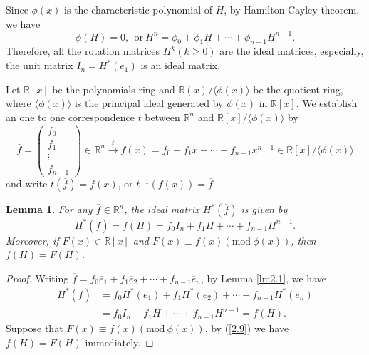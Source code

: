 \documentclass [11pt]{article}
\newtheorem{lem}[thm]{\bf Lemma}
\begin{document}
Since $\phi(x)$ is the characteristic polynomial of $H$, by Hamilton-Cayley theorem, we have
\begin{equation}\label{2.9}
\phi(H)=0, \ \ \text{or}\  H^{n}=\phi_{0}+\phi_{1} H+\cdots+\phi_{n-1} H^{n-1}.
\end{equation}
Therefore, all the rotation matrices $H^{k}(k \geq 0)$ are the ideal matrices, especially, the unit matrix $I_{n}=H^{*}\left(\overline{e}_{1}\right)$ is an ideal matrix.

Let $\mathbb{R}[x]$ be the polynomials ring and $\mathbb{R}(x) /\langle\phi(x)\rangle$ be the quotient ring, where $\langle\phi(x)\rangle$ is the principal ideal generated by $\phi(x)$ in $\mathbb{R}[x]$. We establish an one to one correspondence $t$ between $\mathbb{R}^{n}$ and $\mathbb{R}[x]/ \langle\phi(x)\rangle$ by
\begin{equation}\label{2.10}
\overline{f}=\left(\begin{array}{c}
f_{0} \\
f_{1} \\
\vdots \\
f_{n-1}
\end{array}\right)\in \mathbb{R}^{n} \stackrel{t}{\longrightarrow} f(x)=f_{0}+f_{1} x+\cdots+f_{n-1} x^{n-1} \in \mathbb{R}[x]/ \langle\phi(x)\rangle
\end{equation}
and write $t(\overline{f})=f(x)$, or $t^{-1}(f(x))=\overline{f}$.

\begin{lem} \label{lm2.2}
For any $\overline{f} \in \mathbb{R}^{n}$, the ideal matrix $H^{*}(\overline{f})$ is given by
 \begin{equation}\label{2.11}
 H^{*}( \overline{f})=f(H)=f_{0}I_{n}+f_{1}H+\cdots+f_{n-1}H^{n-1}.
 \end{equation}
 Moreover, if $F(x) \in \mathbb{R}[x]$ and $F(x)\equiv f(x)(\text{mod}\ \phi(x))$, then $f(H)=F(H)$.
 \end{lem}
 \begin{proof}
 Writing $\overline{f}=f_{0} \overline{e}_{1}+f_{1} \overline{e}_{2}+\cdots+f_{n-1} \overline{e}_{n}$, by Lemma \ref{lm2.1}, we have
  \begin{align*}
 H^{*}( \overline{f})&=f_{0}H^{*}( \overline{e}_{1})+f_{1}H^{*}( \overline{e}_{2})+\cdots+f_{n-1}H^{*}(\overline{ e}_{n})\\
 &=f_{0}I_{n}+f_{1}H+\cdots+f_{n-1}H^{n-1}=f(H) .
 \end{align*}
 Suppose that $ F(x) \equiv f(x)(\text{mod}\ \phi(x))$, by (\ref{2.9}) we have $f(H)=F(H)$ immediately.

 \end{proof}
\end{document}
